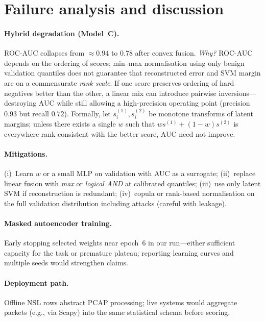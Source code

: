\documentclass[11pt,a4paper]{article}
\begin{document}
\section{Failure analysis and discussion}
\label{sec:failure}

\paragraph{Hybrid degradation (Model~C).} ROC-AUC collapses from $\approx 0.94$ to $0.78$ after convex fusion. \emph{Why?} ROC-AUC depends on the ordering of scores; min--max normalisation using only benign validation quantiles does not guarantee that reconstructed error and SVM margin are on a commensurate \emph{rank scale}. If one score preserves ordering of hard negatives better than the other, a linear mix can introduce pairwise inversions---destroying AUC while still allowing a high-precision operating point (precision $0.93$ but recall $0.72$). Formally, let $s^{(1)}_i, s^{(2)}_i$ be monotone transforms of latent margins; unless there exists a single $w$ such that $w s^{(1)} + (1-w)s^{(2)}$ is everywhere rank-consistent with the better score, AUC need not improve.

\paragraph{Mitigations.} (i)~Learn $w$ or a small MLP on validation with AUC as a surrogate; (ii)~replace linear fusion with \emph{max} or \emph{logical AND} at calibrated quantiles; (iii)~use only latent SVM if reconstruction is redundant; (iv)~copula or rank-based normalisation on the full validation distribution including attacks (careful with leakage).

\paragraph{Masked autoencoder training.} Early stopping selected weights near epoch~6 in our run---either sufficient capacity for the task or premature plateau; reporting learning curves and multiple seeds would strengthen claims.

\paragraph{Deployment path.} Offline NSL rows abstract PCAP processing; live systems would aggregate packets (e.g., via Scapy) into the same statistical schema before scoring.
\end{document}
